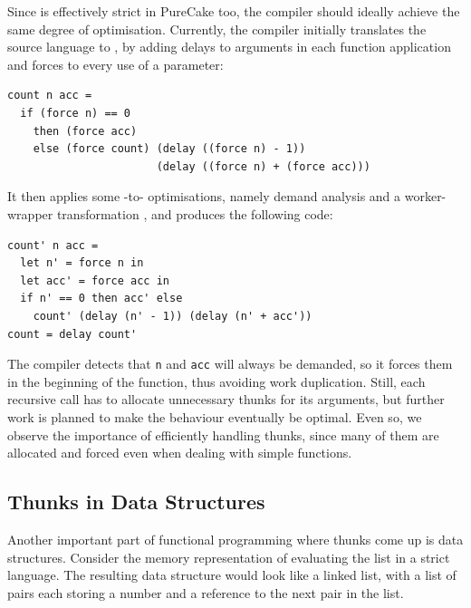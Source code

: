Since  is effectively strict in PureCake too, the compiler should
ideally achieve the same degree of optimisation. Currently, the compiler
initially translates the source language to \ThunkLang{}, by adding delays to
arguments in each function application and forces to every use of a parameter:

\begin{verbatim}
count n acc =
  if (force n) == 0
    then (force acc)
    else (force count) (delay ((force n) - 1))
                       (delay ((force n) + (force acc)))
\end{verbatim}

It then applies some \ThunkLang{}-to-\ThunkLang{} optimisations, namely demand
analysis and a worker-wrapper transformation \cite{Worker/Wrapper}, and produces
the following code:

\begin{verbatim}
count' n acc =
  let n' = force n in
  let acc' = force acc in
  if n' == 0 then acc' else
    count' (delay (n' - 1)) (delay (n' + acc'))
count = delay count'
\end{verbatim}

The compiler detects that \texttt{n} and \texttt{acc} will always be demanded,
so it forces them in the beginning of the function, thus avoiding work
duplication. Still, each recursive call has to allocate unnecessary thunks for
its arguments, but further work is planned to make the behaviour
eventually be optimal. Even so, we observe the importance of efficiently
handling thunks, since many of them are allocated and forced even when dealing
with simple functions.

\subsection{Thunks in Data Structures}

Another important part of functional programming where thunks come up is data
structures. Consider the memory representation of evaluating the list  in a strict language. The resulting data structure would look like a
linked list, with a list of pairs each storing a number and a reference to the
next pair in the list.

